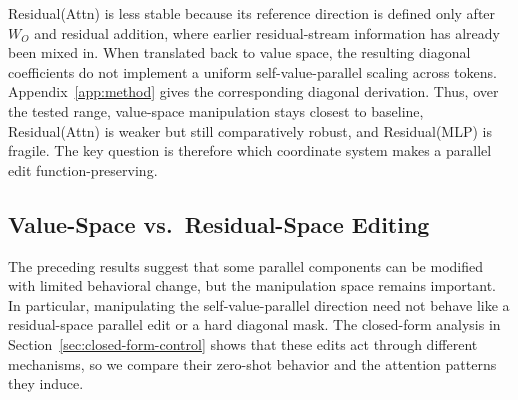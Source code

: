 Residual(Attn) is less stable because its reference direction is defined only
after \(W_O\) and residual addition, where earlier residual-stream information
has already been mixed in. When translated back to value space, the resulting
diagonal coefficients do not implement a uniform self-value-parallel scaling
across tokens. Appendix~\ref{app:method} gives the corresponding diagonal
derivation. Thus, over the tested range, value-space manipulation stays closest to
baseline, Residual(Attn) is weaker but still comparatively robust, and
Residual(MLP) is fragile. The key question is therefore which coordinate
system makes a parallel edit function-preserving.

\subsection{Value-Space vs.\ Residual-Space Editing}
\label{sec:value-vs-residual-exp}

The preceding results suggest that some parallel components can be modified
with limited behavioral change, but the manipulation space remains important. In
particular, manipulating the self-value-parallel direction need not behave like
a residual-space parallel edit or a hard diagonal mask. The closed-form
analysis in Section~\ref{sec:closed-form-control} shows that these edits act
through different mechanisms, so we compare their zero-shot behavior and the
attention patterns they induce.

